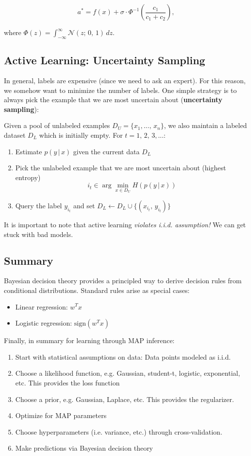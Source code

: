 \documentclass[a4paper]{extarticle}
\begin{document}
\[
    a^* = f(x) + \sigma \cdot \Phi^{-1}(\frac{c_1}{c_1 + c_2}),
\]

where $\Phi(z) = \int_{- \infty}^{\infty} \mathcal{N}(z; \, 0, \, 1) \, dz$.

\subsection{Active Learning: Uncertainty Sampling}

In general, labels are expensive (since we need to ask an expert). For this reason, we somehow want to minimize the number of labels. One simple strategy is to always pick the example that we are most uncertain about (\textbf{uncertainty sampling}):

Given a pool of unlabeled examples $D_U = \{x_1,..., \, x_n\}$, we also maintain a labeled dataset $D_L$ which is initially empty. For $t = 1, \, 2, \, 3,...$:
\begin{enumerate}
    \item Estimate $p(y \, | \, x)$ given the current data $D_L$
    \item Pick the unlabeled example that we are most uncertain about (highest entropy)
    \[
        i_t \in \arg \min_{x \in D_U} H(p(y \, | \, x))
    \]
    \item Query the label $y_{i_t}$ and set $D_L \leftarrow D_L \cup \{(x_{i_t}, \, y_{i_t})\}$
\end{enumerate}

It is important to note that active learning \textit{violates i.i.d. assumption!} We can get stuck with bad models.

\subsection{Summary}

Bayesian decision theory provides a principled way to derive decision rules from conditional distributions. Standard rules arise as special cases:
\begin{itemize}
    \item Linear regression: $w^Tx$
    \item Logistic regression: $\text{sign}(w^Tx)$
\end{itemize}

Finally, in summary for learning through MAP inference:
\begin{enumerate}
    \item Start with statistical assumptions on data: Data points modeled as i.i.d.
    \item Choose a likelihood function, e.g. Gaussian, student-t, logistic, exponential, etc. This provides the loss function
    \item Choose a prior, e.g. Gaussian, Laplace, etc. This provides the regularizer.
    \item Optimize for MAP parameters
    \item Choose hyperparameters (i.e. variance, etc.) through cross-validation.
    \item Make predictions via Bayesian decision theory
\end{enumerate}
\end{document}
